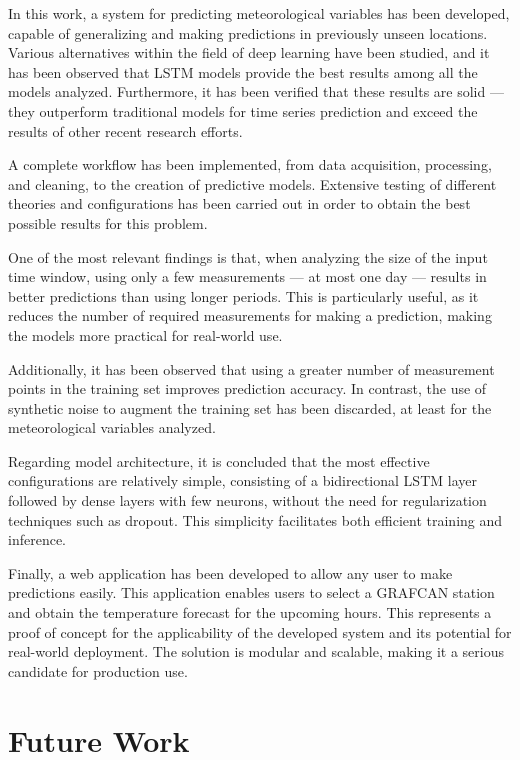In this work, a system for predicting meteorological variables has been developed, capable of generalizing and making predictions in previously unseen locations.
Various alternatives within the field of deep learning have been studied, and it has been observed that LSTM models provide the best results among all the models analyzed.
Furthermore, it has been verified that these results are solid — they outperform traditional models for time series prediction and exceed the results of other recent research efforts.

A complete workflow has been implemented, from data acquisition, processing, and cleaning, to the creation of predictive models.
Extensive testing of different theories and configurations has been carried out in order to obtain the best possible results for this problem.

One of the most relevant findings is that, when analyzing the size of the input time window, using only a few measurements — at most one day — results in better predictions than using longer periods.
This is particularly useful, as it reduces the number of required measurements for making a prediction, making the models more practical for real-world use.

Additionally, it has been observed that using a greater number of measurement points in the training set improves prediction accuracy.
In contrast, the use of synthetic noise to augment the training set has been discarded, at least for the meteorological variables analyzed.

Regarding model architecture, it is concluded that the most effective configurations are relatively simple, consisting of a bidirectional LSTM layer followed by dense layers with few neurons, without the need for regularization techniques such as dropout.
This simplicity facilitates both efficient training and inference.

Finally, a web application has been developed to allow any user to make predictions easily.
This application enables users to select a GRAFCAN station and obtain the temperature forecast for the upcoming hours.
This represents a proof of concept for the applicability of the developed system and its potential for real-world deployment.
The solution is modular and scalable, making it a serious candidate for production use.

\section{Future Work}

